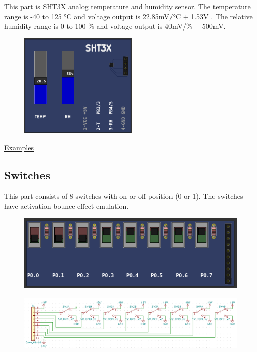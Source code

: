 This part is SHT3X analog temperature and humidity sensor. The temperature  range is -40 to 125 °C  and 
voltage output is 22.85mV/°C + 1.53V . The relative humidity range is 0 to 100 \%  and voltage output is 40mV/\% + 500mV.

\begin{figure}[H]
\center
\includegraphics[width=0.5\textwidth]{img/part_sht3x.png} 
\end{figure} 


\href{https://lcgamboa.github.io/picsimlab_examples/parts_SHT3X_(Temp._Hum.).html}{Examples}

\vspace{0.5cm}

\subsection{Switches}
This part consists of 8 switches with on or off position (0 or 1).
The switches have activation bounce effect emulation.

\begin{figure}[H]
\center
\includegraphics[width=0.99\textwidth]{img/part_switches.png} 
\end{figure} 

\begin{figure}[H]
\center
\includegraphics[width=0.99\textwidth]{img/part_switches_.png} 
\end{figure} 

